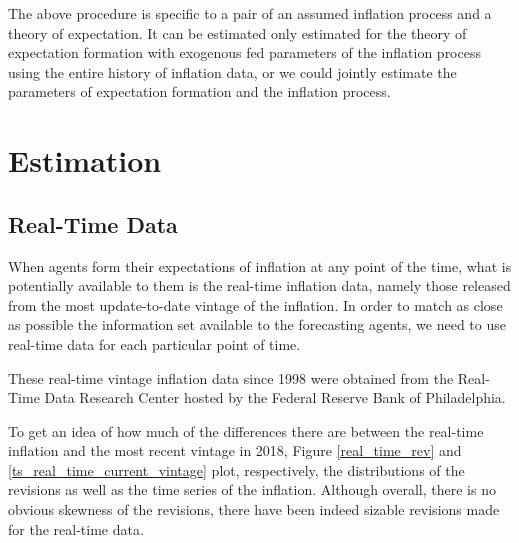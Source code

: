 \documentclass[]{article}
\begin{document}
The above procedure is specific to a pair of an assumed inflation process and a theory of expectation. It can be estimated only estimated for the theory of expectation formation with exogenous fed parameters of the inflation process using the entire history of inflation data, or we could jointly estimate the parameters of expectation formation and the inflation process. 

\section{Estimation}
\subsection{Real-Time Data}

When agents form their expectations of inflation at any point of the time, what is potentially available to them is the real-time inflation data, namely those released from the most update-to-date vintage of the inflation. In order to match as close as possible the information set available to the forecasting agents, we need to use real-time data for each particular point of time.  

These real-time vintage inflation data since 1998 were obtained from the Real-Time Data Research Center hosted by the Federal Reserve Bank of Philadelphia. 

To get an idea of how much of the differences there are between the real-time inflation and the most recent vintage in 2018, Figure \ref{real_time_rev} and \ref{ts_real_time_current_vintage} plot, respectively, the distributions of the revisions as well as the time series of the inflation. Although overall, there is no obvious skewness of the revisions, there have been indeed sizable revisions made for the real-time data. 
\end{document}
